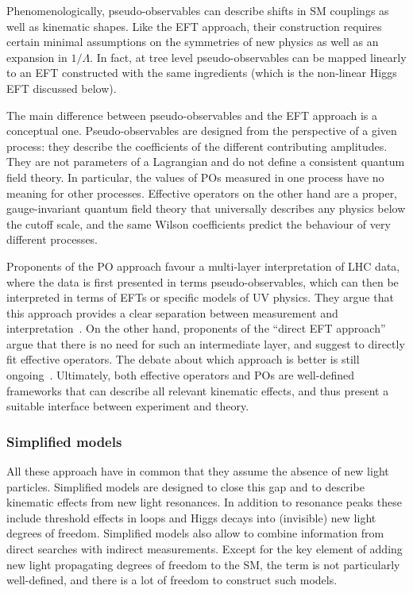 Phenomenologically, pseudo-observables can describe shifts in SM
couplings as well as kinematic shapes. Like the EFT approach, their
construction requires certain minimal assumptions on the symmetries of
new physics as well as an expansion in $1/\Lambda$. In fact, at tree
level pseudo-observables can be mapped linearly to an EFT constructed
with the same ingredients (which is the non-linear Higgs EFT discussed
below).

The main difference between pseudo-observables and the EFT approach is
a conceptual one. Pseudo-observables are designed from the perspective
of a given process: they describe the coefficients of the different
contributing amplitudes. They are not parameters of a Lagrangian and
do not define a consistent quantum field theory. In particular, the
values of POs measured in one process have no meaning for other
processes. Effective operators on the other hand are a proper,
gauge-invariant quantum field theory that universally describes any
physics below the cutoff scale, and the same Wilson coefficients
predict the behaviour of very different processes.

Proponents of the PO approach favour a multi-layer interpretation of
LHC data, where the data is first presented in terms
pseudo-observables, which can then be interpreted in terms of EFTs or
specific models of UV physics. They argue that this approach provides
a clear separation between measurement and
interpretation~\cite{deFlorian:2016spz}. On the other hand, proponents
of the ``direct EFT approach'' argue that there is no need for such an
intermediate layer, and suggest to directly fit effective
operators. The debate about which approach is better is still
ongoing~\cite{deFlorian:2016spz}. Ultimately, both effective operators
and POs are well-defined frameworks that can describe all relevant
kinematic effects, and thus present a suitable interface between
experiment and theory.



\subsubsection{Simplified models}

All these approach have in common that they assume the absence of new
light particles. Simplified models are designed to close this gap and
to describe kinematic effects from new light resonances. In addition
to resonance peaks these include threshold effects in loops and Higgs
decays into (invisible) new light degrees of freedom. Simplified
models also allow to combine information from direct searches with
indirect measurements. Except for the key element of adding new light
propagating degrees of freedom to the SM, the term is not particularly
well-defined, and there is a lot of freedom to construct such models.

